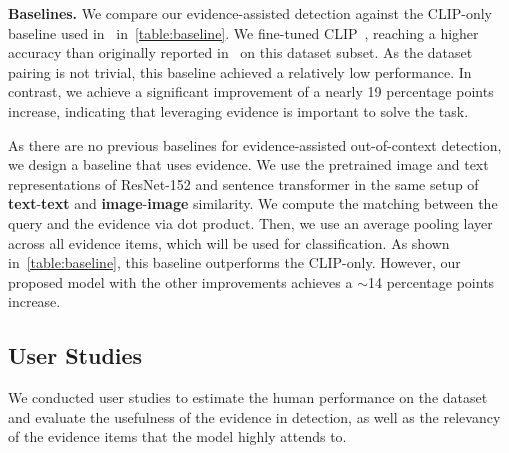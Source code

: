 \textbf{Baselines.}
We compare our evidence-assisted detection against the CLIP-only baseline used in~\cite{luo2021newsclippings} in~\autoref{table:baseline}. We fine-tuned CLIP~\cite{radford2021learning}, reaching a higher accuracy than originally reported in~\cite{luo2021newsclippings} on this dataset subset. As the dataset pairing is not trivial, this baseline achieved a relatively low performance. 
In contrast, we achieve a significant improvement of a nearly 19 percentage points increase, indicating that leveraging evidence is important to solve the task. 
\begin{table} [!t]
\centering
{}
\caption{Classification performance on the test set for our model in comparison with baselines.
} \label{table:baseline}
\vspace{-2mm}
\end{table}

As there are no previous baselines for evidence-assisted out-of-context detection, we design a baseline that uses evidence. We use the pretrained image and text representations of ResNet-152 and sentence transformer in the same setup of \textbf{\textcolor{myblue}{text}}-\textbf{\textcolor{myblue}{text}} and \textbf{\textcolor{myOrange}{image}}-\textbf{\textcolor{myOrange}{image}} similarity. We compute the matching between the query and the evidence via dot product. Then, we use an average pooling layer across all evidence items, which will be used for classification. As shown in~\autoref{table:baseline}, this baseline outperforms the CLIP-only. However, our proposed model with the other improvements achieves a $\sim$14 percentage points increase.
\subsection{User Studies}
We conducted user studies to estimate the human performance on the dataset and evaluate the usefulness of the evidence in detection, as well as the relevancy of the evidence items that the model highly attends to.
\vspace{-2mm}
